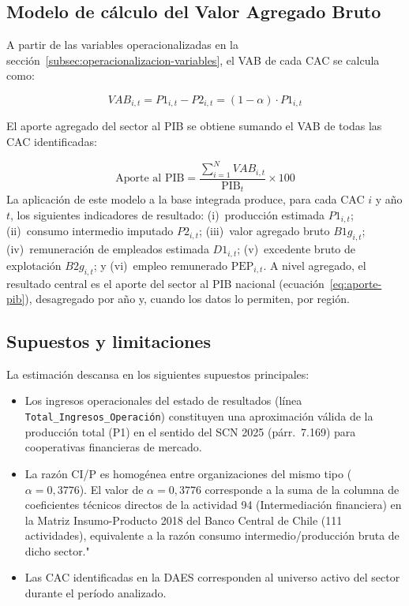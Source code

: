 \subsection{Modelo de cálculo del Valor Agregado Bruto}
\label{subsec:modelo-vab}

A partir de las variables operacionalizadas en la
sección~\ref{subsec:operacionalizacion-variables}, el VAB de cada
CAC se calcula como:

\begin{equation}
VAB_{i,t} = P1_{i,t} - P2_{i,t} = (1-\alpha)\cdot P1_{i,t}
\label{eq:vab}
\end{equation}

\noindent El aporte agregado del sector al PIB se obtiene sumando
el VAB de todas las CAC identificadas:

\begin{equation}
\text{Aporte al PIB} = \frac{\sum_{i=1}^{N} VAB_{i,t}}{\text{PIB}_t}
\times 100
\label{eq:aporte-pib}
\end{equation}
\noindent La aplicación de este modelo a la base integrada produce, 
para cada CAC $i$ y año $t$, los siguientes indicadores de resultado:
(i)~producción estimada $P1_{i,t}$; (ii)~consumo intermedio imputado 
$P2_{i,t}$; (iii)~valor agregado bruto $B1g_{i,t}$; 
(iv)~remuneración de empleados estimada $D1_{i,t}$; 
(v)~excedente bruto de explotación $B2g_{i,t}$; y 
(vi)~empleo remunerado $\text{PEP}_{i,t}$. 
A nivel agregado, el resultado central es el aporte del sector 
al PIB nacional (ecuación~\ref{eq:aporte-pib}), desagregado por 
año y, cuando los datos lo permiten, por región. 
\subsection{Supuestos y limitaciones}
\label{subsec:supuestos-limitaciones}

La estimación descansa en los siguientes supuestos principales:

\begin{itemize}
    \item Los ingresos operacionales del estado de resultados
    (línea \texttt{Total\_Ingresos\_Operación}) constituyen una
    aproximación válida de la producción total (P1) en el
    sentido del SCN 2025 (párr.~7.169) para cooperativas
    financieras de mercado.
    \item La razón CI/P es homogénea entre organizaciones
    del mismo tipo ($\alpha = 0{,}3776$). El valor de $\alpha = 0{,}3776$ corresponde a la suma de la columna de coeficientes técnicos directos de la actividad 94 (Intermediación financiera) en la Matriz Insumo-Producto 2018 del Banco Central de Chile (111 actividades), equivalente a la razón consumo intermedio/producción bruta de dicho sector." \cite{banco_central_de_chile_matriz_2018}
    \item Las CAC identificadas en la DAES corresponden al
    universo activo del sector durante el período analizado.
\end{itemize}

